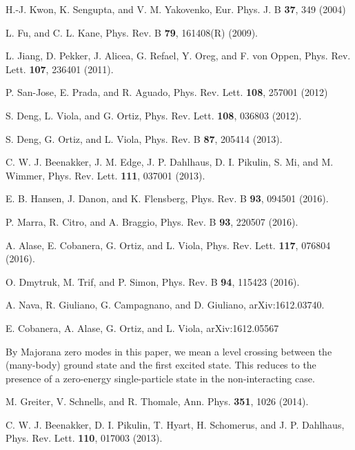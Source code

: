 \documentclass[aps, prb, showpacs, twocolumn, %
amssymb,superscriptaddress]{revtex4}
\begin{document}
\begin{thebibliography}{}
H.-J. Kwon, K. Sengupta, and V. M. Yakovenko, Eur. Phys. J. B {\bf 37}, 349 (2004) 

L. Fu, and C. L. Kane, Phys. Rev. B {\bf 79}, 161408(R) (2009).

L. Jiang, D. Pekker, J. Alicea, G. Refael, Y. Oreg, and F. von Oppen, Phys. Rev. Lett. {\bf 107}, 236401 (2011).

P. San-Jose, E. Prada, and R. Aguado, Phys. Rev. Lett. {\bf 108}, 257001 (2012)

S. Deng, L. Viola, and G. Ortiz, Phys. Rev. Lett. {\bf 108}, 036803 (2012).

S. Deng, G. Ortiz, and L. Viola, Phys. Rev. B {\bf 87}, 205414 (2013).

C. W. J. Beenakker, J. M. Edge, J. P. Dahlhaus, D. I. Pikulin,  S. Mi, and M. Wimmer, Phys. Rev. Lett. {\bf 111}, 037001 (2013).

E. B. Hansen, J. Danon, and K. Flensberg, Phys. Rev. B {\bf 93}, 094501 (2016).

P. Marra, R. Citro, and A. Braggio, Phys. Rev. B {\bf 93}, 220507 (2016).

A. Alase, E. Cobanera, G. Ortiz, and L. Viola, Phys. Rev. Lett. {\bf 117}, 076804 (2016).

O. Dmytruk, M. Trif, and P. Simon, Phys. Rev. B {\bf 94}, 115423 (2016).

A. Nava, R. Giuliano, G. Campagnano, and D. Giuliano, arXiv:1612.03740. 

E. Cobanera, A. Alase, G. Ortiz, and L. Viola, arXiv:1612.05567

By Majorana zero modes in this paper, we mean a level crossing between the (many-body) ground state and the first excited state. This reduces to the presence of a zero-energy single-particle state in the non-interacting case.

M. Greiter, V. Schnells, and R. Thomale,  Ann. Phys. {\bf 351}, 1026 (2014). 

C. W. J. Beenakker, D. I. Pikulin, T. Hyart, H. Schomerus, and J. P. Dahlhaus, Phys. Rev. Lett. {\bf 110}, 017003 (2013).


\end{thebibliography}
\end{document}
